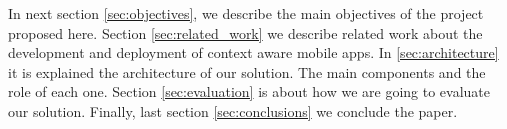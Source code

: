 In next section \ref{sec:objectives}, we describe the main
objectives of the project proposed here.
Section \ref{sec:related_work} we describe related
work about the development and deployment of
context aware mobile apps.
In \ref{sec:architecture} it is explained the architecture of our solution. The main components and the role of
each one.
Section \ref{sec:evaluation} is about how we are going
to evaluate our solution.
Finally, last section \ref{sec:conclusions} we conclude
the paper.
